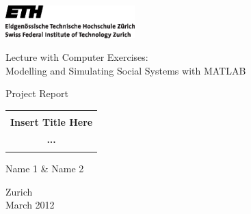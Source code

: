 
\thispagestyle{empty}

\begin{center}
\includegraphics[width=5cm]{ETHlogo.eps}

\bigskip


\bigskip


\bigskip


\LARGE{ 	Lecture with Computer Exercises:\\ }
\LARGE{ Modelling and Simulating Social Systems with MATLAB\\}

\bigskip

\bigskip

\small{Project Report}\\

\bigskip

\bigskip

\bigskip

\bigskip


\begin{tabular}{|c|}
\hline
\\
\textbf{\LARGE{Insert Title Here}}\\
\textbf{\LARGE{...}}\\
\\
\hline
\end{tabular}
\bigskip

\bigskip

\bigskip

\LARGE{Name 1 \& Name 2}



\bigskip

\bigskip

\bigskip

\bigskip

\bigskip

\bigskip

\bigskip

\bigskip

Zurich\\
March 2012\\

\end{center}


